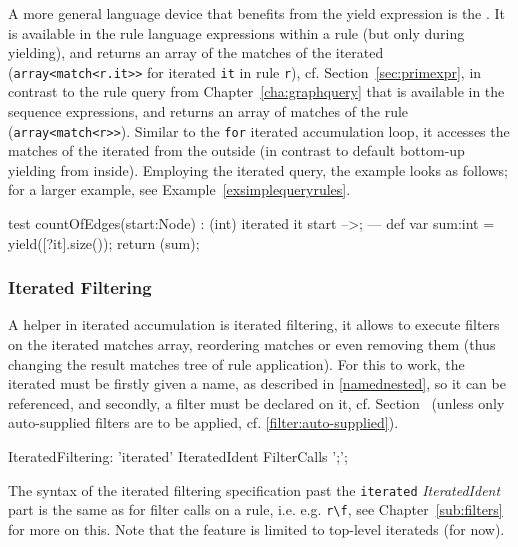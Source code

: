 A more general language device that benefits from the yield expression is the . 
It is available in the rule language expressions within a rule (but only during yielding), and returns an array of the matches of the iterated (\texttt{array<match<r.it>>} for iterated \texttt{it} in rule \texttt{r}), cf. Section~\ref{sec:primexpr}, in contrast to the rule query from Chapter~\ref{cha:graphquery} that is available in the sequence expressions, and returns an array of matches of the rule (\texttt{array<match<r>>}).
Similar to the \texttt{for} iterated accumulation loop, it accesses the matches of the iterated from the outside (in contrast to default bottom-up yielding from inside).
Employing the iterated query, the example looks as follows; for a larger example, see Example~\ref{exsimplequeryrules}.

\begin{example}
  \begin{grgen}
test countOfEdges(start:Node) : (int)
{
	iterated it {
		start -->;
	} 
---
	def var sum:int = yield([?it].size());
	return (sum);
}
  \end{grgen}
\end{example}
	
\pagebreak
	
\subsubsection*{Iterated Filtering}\label{sub:iteratedfilter}

A helper in iterated accumulation is iterated filtering, it allows to execute filters on the iterated matches array, reordering matches or even removing them (thus changing the result matches tree of rule application).
For this to work, the iterated must be firstly given a name, as described in \ref{namednested}, so it can be referenced, and secondly, a filter must be declared on it, cf. Section~\label{cardinality} (unless only auto-supplied filters are to be applied, cf. \ref{filter:auto-supplied}).

\begin{rail}
  IteratedFiltering: 
    'iterated' IteratedIdent FilterCalls ';';
\end{rail}

The syntax of the iterated filtering specification past the \texttt{iterated} \emph{IteratedIdent} part is the same as for filter calls on a rule, i.e. e.g. \verb#r\f#, see Chapter~\ref{sub:filters} for more on this.
Note that the feature is limited to top-level iterateds (for now).

